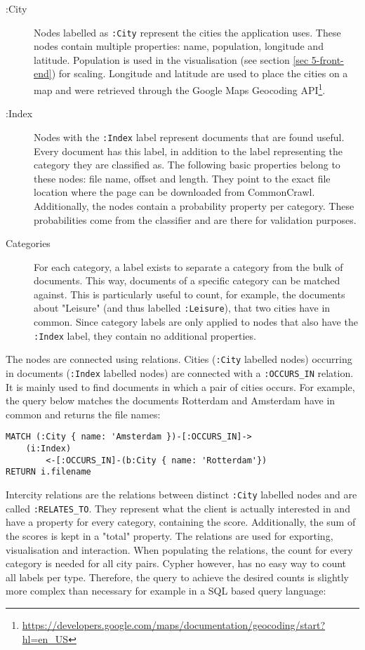 \begin{description}
\item[:City] Nodes labelled as \texttt{:City} represent the cities the application uses. These nodes contain multiple properties: name, population, longitude and latitude. Population is used in the visualisation (see section \ref{sec 5-front-end}) for scaling. Longitude and latitude are used to place the cities on a map and were retrieved through the Google Maps Geocoding API\footnote{\url{https://developers.google.com/maps/documentation/geocoding/start?hl=en_US}}.
\item[:Index] Nodes with the \texttt{:Index} label represent documents that are found useful. Every document has this label, in addition to the label representing the category they are classified as. The following basic properties belong to these nodes: file name, offset and length. They point to the exact file location where the page can be downloaded from CommonCrawl. Additionally, the nodes contain a probability property per category. These probabilities come from the classifier and are there for validation purposes.
\item[Categories] For each category, a label exists to separate a category from the bulk of documents. This way, documents of a specific category can be matched against. This is particularly useful to count, for example, the documents about "Leisure" (and thus labelled \texttt{:Leisure}), that two cities have in common. Since category labels are only applied to nodes that also have the \texttt{:Index} label, they contain no additional properties.
\end{description}

The nodes are connected using relations. Cities (\texttt{:City} labelled nodes) occurring in documents (\texttt{:Index} labelled nodes) are connected with a \texttt{:OCCURS\_IN} relation. It is mainly used to find documents in which a pair of cities occurs. For example, the query below matches the documents Rotterdam and Amsterdam have in common and returns the file names:

\begin{lstlisting}[language=cypher, caption={Querying documents containing two cities}, label={lst:query-occ}]
MATCH (:City { name: 'Amsterdam })-[:OCCURS_IN]->
    (i:Index)
        <-[:OCCURS_IN]-(b:City { name: 'Rotterdam'})
RETURN i.filename
\end{lstlisting}

Intercity relations are the relations between distinct \texttt{:City} labelled nodes and are called \texttt{:RELATES\_TO}. They represent what the client is actually interested in and have a property for every category, containing the score. Additionally, the sum of the scores is kept in a "total" property. The relations are used for exporting, visualisation and interaction. When populating the relations, the count for every category is needed for all city pairs. Cypher however, has no easy way to count all labels per type. Therefore, the query to achieve the desired counts is slightly more complex than necessary for example in a SQL based query language:

